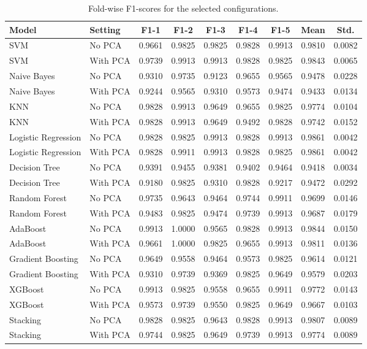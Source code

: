 \documentclass[12pt,a4paper]{article}
\begin{document}
\begin{longtable}{|p{2.8cm}|p{1.3cm}|c|c|c|c|c|c|c|}
\caption{Fold-wise F1-scores for the selected configurations.}\\
\hline
\textbf{Model} & \textbf{Setting} & \textbf{F1-1} & \textbf{F1-2} & \textbf{F1-3} & \textbf{F1-4} & \textbf{F1-5} & \textbf{Mean} & \textbf{Std.}\\ \hline
SVM & No PCA & 0.9661 & 0.9825 & 0.9825 & 0.9828 & 0.9913 & 0.9810 & 0.0082 \\
SVM & With PCA & 0.9739 & 0.9913 & 0.9913 & 0.9828 & 0.9825 & 0.9843 & 0.0065 \\
Naive Bayes & No PCA & 0.9310 & 0.9735 & 0.9123 & 0.9655 & 0.9565 & 0.9478 & 0.0228 \\
Naive Bayes & With PCA & 0.9244 & 0.9565 & 0.9310 & 0.9573 & 0.9474 & 0.9433 & 0.0134 \\
KNN & No PCA & 0.9828 & 0.9913 & 0.9649 & 0.9655 & 0.9825 & 0.9774 & 0.0104 \\
KNN & With PCA & 0.9828 & 0.9913 & 0.9649 & 0.9492 & 0.9828 & 0.9742 & 0.0152 \\
Logistic Regression & No PCA & 0.9828 & 0.9825 & 0.9913 & 0.9828 & 0.9913 & 0.9861 & 0.0042 \\
Logistic Regression & With PCA & 0.9828 & 0.9911 & 0.9913 & 0.9828 & 0.9825 & 0.9861 & 0.0042 \\
Decision Tree & No PCA & 0.9391 & 0.9455 & 0.9381 & 0.9402 & 0.9464 & 0.9418 & 0.0034 \\
Decision Tree & With PCA & 0.9180 & 0.9825 & 0.9310 & 0.9828 & 0.9217 & 0.9472 & 0.0292 \\
Random Forest & No PCA & 0.9735 & 0.9643 & 0.9464 & 0.9744 & 0.9911 & 0.9699 & 0.0146 \\
Random Forest & With PCA & 0.9483 & 0.9825 & 0.9474 & 0.9739 & 0.9913 & 0.9687 & 0.0179 \\
AdaBoost & No PCA & 0.9913 & 1.0000 & 0.9565 & 0.9828 & 0.9913 & 0.9844 & 0.0150 \\
AdaBoost & With PCA & 0.9661 & 1.0000 & 0.9825 & 0.9655 & 0.9913 & 0.9811 & 0.0136 \\
Gradient Boosting & No PCA & 0.9649 & 0.9558 & 0.9464 & 0.9573 & 0.9825 & 0.9614 & 0.0121 \\
Gradient Boosting & With PCA & 0.9310 & 0.9739 & 0.9369 & 0.9825 & 0.9649 & 0.9579 & 0.0203 \\
XGBoost & No PCA & 0.9913 & 0.9825 & 0.9558 & 0.9655 & 0.9911 & 0.9772 & 0.0143 \\
XGBoost & With PCA & 0.9573 & 0.9739 & 0.9550 & 0.9825 & 0.9649 & 0.9667 & 0.0103 \\
Stacking & No PCA & 0.9828 & 0.9825 & 0.9643 & 0.9828 & 0.9913 & 0.9807 & 0.0089 \\
Stacking & With PCA & 0.9744 & 0.9825 & 0.9649 & 0.9739 & 0.9913 & 0.9774 & 0.0089 \\
\hline
\end{longtable}
\end{document}
